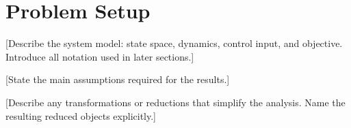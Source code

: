 \section{Problem Setup}\label{sec:setup}

[Describe the system model: state space, dynamics, control input, and
objective. Introduce all notation used in later sections.]

\begin{assumption}\label{ass:main}
[State the main assumptions required for the results.]
\end{assumption}

[Describe any transformations or reductions that simplify the analysis.
Name the resulting reduced objects explicitly.]
